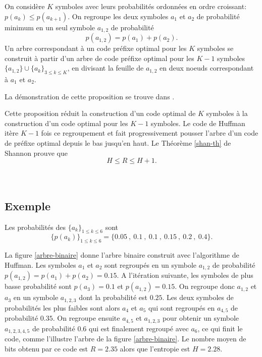 \begin{proposition}
On consid\`ere $K$ symboles avec leurs probabilit\'es
ordonn\'ees en ordre croissant: $p(a_k) \leq p(a_{k+1})$.
On regroupe les deux symboles $a_1$ et $a_2$ de probabilit\'e
minimum en un seul symbole $a_{1,2}$ de probabilit\'e
\[
p(a_{1,2}) = p(a_1) + p(a_2) .
\]
Un arbre correspondant \`a un code pr\'efixe optimal pour
les $K$ symboles se construit \`a partir
d'un arbre de code pr\'efixe optimal pour les $K-1$ symboles
$\{a_{1,2}\} \cup \{ a_k \}_{3 \leq k \leq K}$,
en divisant la feuille de
$a_{1,2}$ en deux noeuds correspondant \`a $a_1$ et $a_2$.
\end{proposition}

La d\'emonstration de cette proposition se trouve dans
\cite{bremaud-proba}.

Cette proposition r\'eduit la construction d'un code optimal de
$K$ symboles \`a la construction
d'un code optimal pour les $K-1$ symboles.
Le code de Huffman it\`ere $K-1$ fois
ce regroupement et fait progressivement pousser l'arbre
d'un code de pr\'efixe optimal depuis le bas jusqu'en haut.
Le Th\'eor\`eme \ref{shan-th} de Shannon prouve que
\begin{equation}
\label{entropy-bound}
H \leq R  \leq H + 1 .
\end{equation}
\\
\\
\subsection*{Exemple}
Les probabilit\'es des $\{a_k\}_{1 \leq k \leq 6}$ sont
\begin{equation}
\label{proba-code}
\{p(a_k)\}_{1 \leq k \leq 6} = \{0.05~,~0.1~,~0.1~,~0.15~,~0.2~,~0.4\}.
\end{equation}

La figure \ref{arbre-binaire}
donne l'arbre binaire construit avec l'algorithme
de Huffman.
Les symboles $a_1$ et $a_2$ sont regroup\'es
en un symbole $a_{1,2}$
de probabilit\'e $p(a_{1,2}) = p(a_1)+p(a_2)= 0.15$. A l'it\'eration suivante,
les symboles de plus basse probabilit\'e sont
$p(a_3) = 0.1$ et $p(a_{1,2}) = 0.15$. On regroupe donc
$a_{1,2}$ et $a_3$ en un symbole $a_{1,2,3}$ dont la probabilit\'e
est $0.25$. Les deux symboles de probabilit\'es les plus faibles sont
alors $a_4$ et
$a_5$ qui sont regroup\'es en $a_{4,5}$
de probabilit\'e $0.35$. On regroupe ensuite $a_{4,5}$ et
$a_{1,2,3}$ pour obtenir un symbole $a_{1,2,3,4,5}$ de probabilit\'e
$0.6$ qui est finalement regroup\'e avec $a_6$, ce qui finit
le code, comme l'illustre
l'arbre de la figure \ref{arbre-binaire}.
Le nombre moyen de bits obtenu par ce code est
$R= 2.35$ alors que l'entropie est $H = 2.28$.

